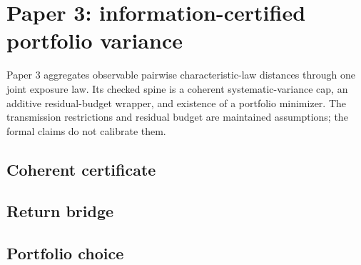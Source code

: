 \chapter{Paper 3: information-certified portfolio variance}
\label{chap:distance-implied}

Paper 3 aggregates observable pairwise characteristic-law distances through one
joint exposure law.  Its checked spine is a coherent systematic-variance cap,
an additive residual-budget wrapper, and existence of a portfolio minimizer.
The transmission restrictions and residual budget are maintained assumptions;
the formal claims do not calibrate them.

\section{Coherent certificate}


\section{Return bridge}


\section{Portfolio choice}

